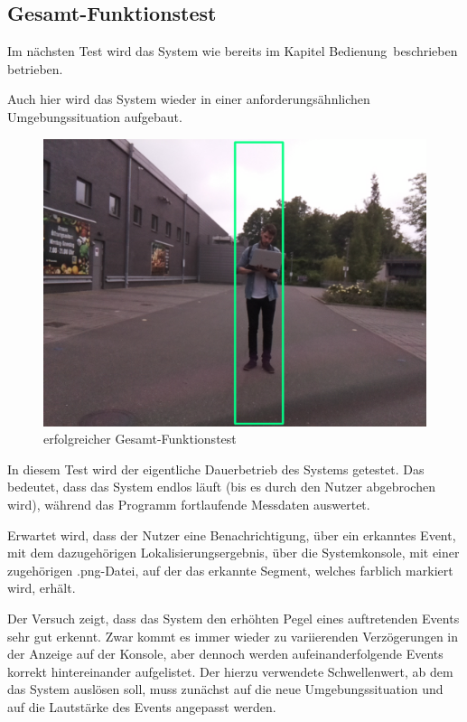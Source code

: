 \subsection{Gesamt-Funktionstest}

Im nächsten Test wird das System wie bereits im Kapitel \glqq Bedienung\grqq\ beschrieben betrieben. 

Auch hier wird das System wieder in einer anforderungsähnlichen Umgebungssituation aufgebaut.

\begin{figure}[!h]
	\begin{center}
		\includegraphics[scale=0.2]{Sections/Tests/Test_7}
	\end{center}
	\caption{erfolgreicher Gesamt-Funktionstest}
	\label{fig:Test_7}
\end{figure}

In diesem Test wird der eigentliche Dauerbetrieb des Systems getestet. Das bedeutet, dass das System endlos läuft (bis es durch den Nutzer abgebrochen wird), während das Programm fortlaufende Messdaten auswertet. 

Erwartet wird, dass der Nutzer eine Benachrichtigung, über ein erkanntes Event, mit dem dazugehörigen Lokalisierungsergebnis, über die Systemkonsole, mit einer zugehörigen .png-Datei, auf der das erkannte Segment, welches farblich markiert wird, erhält.

Der Versuch zeigt, dass das System den erhöhten Pegel eines auftretenden Events sehr gut erkennt. Zwar kommt es immer wieder zu variierenden Verzögerungen in der Anzeige auf der Konsole, aber dennoch werden aufeinanderfolgende Events korrekt hintereinander aufgelistet. Der hierzu verwendete Schwellenwert, ab dem das System auslösen soll, muss zunächst auf die neue Umgebungssituation und auf die Lautstärke des Events angepasst werden. 

